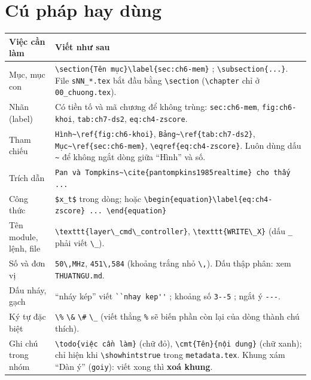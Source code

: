 \documentclass[11pt,a4paper]{article}
\newcommand{\file}[1]{\texttt{#1}}
\begin{document}
\section{Cú pháp hay dùng}
\begin{tabular}{@{}>{\raggedright\arraybackslash}p{4.0cm}>{\raggedright\arraybackslash}p{12.1cm}@{}}
\toprule
\textbf{Việc cần làm} & \textbf{Viết như sau} \\ \midrule
Mục, mục con & \verb+\section{Tên mục}\label{sec:ch6-mem}+ ; \verb+\subsection{...}+. File \verb+sNN_*.tex+ bắt đầu bằng \verb+\section+ (\verb+\chapter+ chỉ ở \verb+00_chuong.tex+). \\
Nhãn (label) & Có tiền tố và mã chương để không trùng: \verb+sec:ch6-mem+, \verb+fig:ch6-khoi+, \verb+tab:ch7-ds2+, \verb+eq:ch4-zscore+. \\
Tham chiếu & \verb+Hình~\ref{fig:ch6-khoi}+, \verb+Bảng~\ref{tab:ch7-ds2}+, \verb+Mục~\ref{sec:ch6-mem}+, \verb+\eqref{eq:ch4-zscore}+. Luôn dùng dấu \verb+~+ để không ngắt dòng giữa ``Hình'' và số. \\
Trích dẫn & \verb+Pan và Tompkins~\cite{pantompkins1985realtime} cho thấy ...+ \\
Công thức & \verb+$x_t$+ trong dòng; hoặc \verb+\begin{equation}\label{eq:ch4-zscore} ... \end{equation}+ \\
Tên module, lệnh, file & \verb+\texttt{layer\_cmd\_controller}+, \verb+\texttt{WRITE\_X}+ (dấu \verb+_+ phải viết \verb+\_+). \\
Số và đơn vị & \verb+50\,MHz+, \verb+451\,584+ (khoảng trắng nhỏ \verb+\,+). Dấu thập phân: xem \file{THUATNGU.md}. \\
Dấu nháy, gạch & ``nháy kép'' viết \verb+``nhay kep''+ ; khoảng số \verb+3--5+ ; ngắt ý \verb+---+. \\
Ký tự đặc biệt & \verb+\%+ \quad \verb+\&+ \quad \verb+\#+ \quad \verb+\_+ (viết thẳng \verb+%+ sẽ biến phần còn lại của dòng thành chú thích). \\
Ghi chú trong nhóm & \verb+\todo{việc cần làm}+ (chữ đỏ), \verb+\cmt{Tên}{nội dung}+ (chữ xanh); chỉ hiện khi \verb+\showhintstrue+ trong \file{metadata.tex}. Khung xám ``Dàn ý'' (\verb+goiy+): viết xong thì \textbf{xoá khung}. \\ \bottomrule
\end{tabular}
\end{document}
